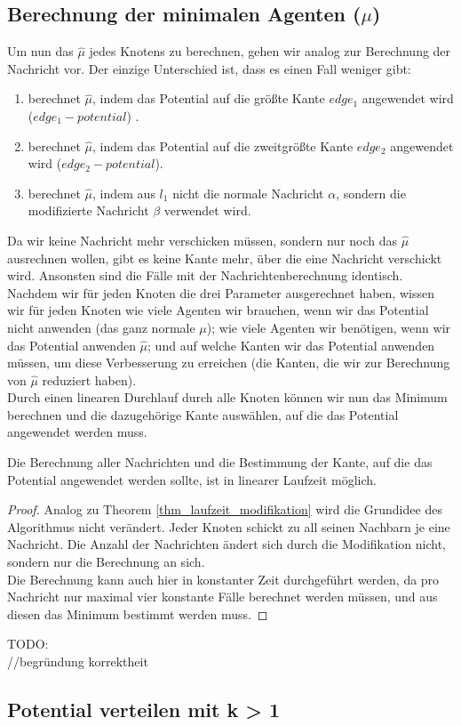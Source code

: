 	
	\subsection*{Berechnung der minimalen Agenten ($\mu$)}
	
	Um nun das $\hat{\mu}$ jedes Knotens zu berechnen, gehen wir analog zur Berechnung der Nachricht vor. Der einzige Unterschied ist, dass es einen Fall weniger gibt: 
	\begin{enumerate}
		\item berechnet $\hat{\mu}$, indem das Potential auf die größte Kante $edge_{1}$ angewendet wird ($edge_{1} - potential$) .
		\item berechnet $\hat{\mu}$, indem das Potential auf die zweitgrößte Kante $edge_{2}$ angewendet wird ($edge_{2} - potential$).
		\item berechnet $\hat{\mu}$, indem aus $l_{1}$ nicht die normale Nachricht $\alpha$, sondern die modifizierte Nachricht $\beta$ verwendet wird.
	\end{enumerate}
	Da wir keine Nachricht mehr verschicken müssen, sondern nur noch das $\hat{\mu}$ ausrechnen wollen, gibt es keine Kante mehr, über die eine Nachricht verschickt wird. Ansonsten sind die Fälle mit der Nachrichtenberechnung identisch.\\
	Nachdem wir für jeden Knoten die drei Parameter ausgerechnet haben, wissen wir für jeden Knoten wie viele Agenten wir brauchen, wenn wir das Potential nicht anwenden (das ganz normale $\mu$); wie viele Agenten wir benötigen, wenn wir das Potential anwenden $\hat{\mu}$; und auf welche Kanten wir das Potential anwenden müssen, um diese Verbesserung zu erreichen (die Kanten, die wir zur Berechnung von $\hat{\mu}$ reduziert haben).\\
	Durch einen linearen Durchlauf durch alle Knoten können wir nun das Minimum berechnen und die dazugehörige Kante auswählen, auf die das Potential angewendet werden muss.
	\begin{theorem}
		Die Berechnung aller Nachrichten und die Bestimmung der Kante, auf die das Potential angewendet werden sollte, ist in linearer Laufzeit möglich.
	\end{theorem}
	\begin{proof}
		Analog zu Theorem \ref{thm_laufzeit_modifikation} wird die Grundidee des Algorithmus nicht verändert. Jeder Knoten schickt zu all seinen Nachbarn je eine Nachricht. Die Anzahl der Nachrichten ändert sich durch die Modifikation nicht, sondern nur die Berechnung an sich.\\Die Berechnung kann auch hier in konstanter Zeit durchgeführt werden, da pro Nachricht nur maximal vier konstante Fälle berechnet werden müssen, und aus diesen das Minimum bestimmt werden muss.
	\end{proof}
	TODO:\\
	//begründung korrektheit

\subsection{Potential verteilen mit k > 1}